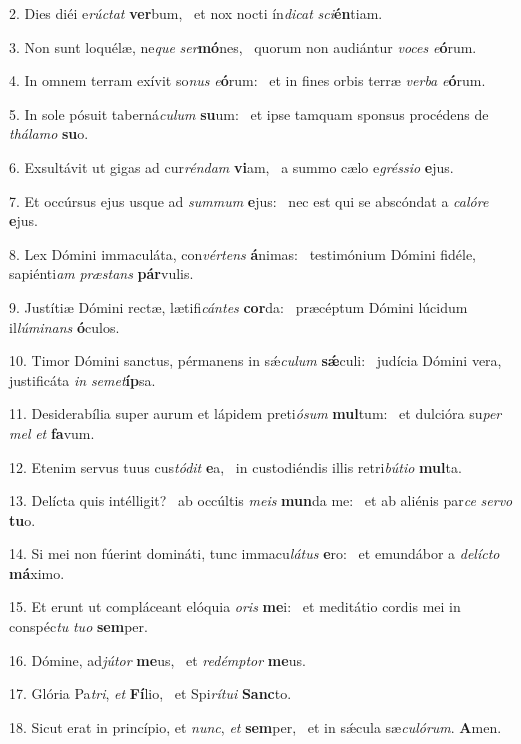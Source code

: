 2. Dies diéi e\textit{rúc}\textit{tat} \textbf{ver}bum, \ast\  et nox nocti ín\textit{di}\textit{cat} \textit{sci}\textbf{én}tiam.\

3. Non sunt loquélæ, ne\textit{que} \textit{ser}\textbf{mó}nes, \ast\  quorum non audiántur \textit{vo}\textit{ces} \textit{e}\textbf{ó}rum.\

4. In omnem terram exívit so\textit{nus} \textit{e}\textbf{ó}rum: \ast\  et in fines orbis terræ \textit{ver}\textit{ba} \textit{e}\textbf{ó}rum.\

5. In sole pósuit taberná\textit{cu}\textit{lum} \textbf{su}um: \ast\  et ipse tamquam sponsus procédens de \textit{thá}\textit{la}\textit{mo} \textbf{su}o.\

6. Exsultávit ut gigas ad cur\textit{rén}\textit{dam} \textbf{vi}am, \ast\  a summo cælo e\textit{grés}\textit{si}\textit{o} \textbf{e}jus.\

7. Et occúrsus ejus usque ad \textit{sum}\textit{mum} \textbf{e}jus: \ast\  nec est qui se abscóndat a \textit{ca}\textit{ló}\textit{re} \textbf{e}jus.\

8. Lex Dómini immaculáta, con\textit{vér}\textit{tens} \textbf{á}nimas: \ast\  testimónium Dómini fidéle, sapiénti\textit{am} \textit{præ}\textit{stans} \textbf{pár}vulis.\

9. Justítiæ Dómini rectæ, lætifi\textit{cán}\textit{tes} \textbf{cor}da: \ast\  præcéptum Dómini lúcidum il\textit{lú}\textit{mi}\textit{nans} \textbf{ó}culos.\

10. Timor Dómini sanctus, pérmanens in sǽ\textit{cu}\textit{lum} \textbf{sǽ}culi: \ast\  judícia Dómini vera, justificáta \textit{in} \textit{se}\textit{met}\textbf{íp}sa.\

11. Desiderabília super aurum et lápidem preti\textit{ó}\textit{sum} \textbf{mul}tum: \ast\  et dulcióra su\textit{per} \textit{mel} \textit{et} \textbf{fa}vum.\

12. Etenim servus tuus cus\textit{tó}\textit{dit} \textbf{e}a, \ast\  in custodiéndis illis retri\textit{bú}\textit{ti}\textit{o} \textbf{mul}ta.\

13. Delícta quis intélligit? \dag\  ab occúltis \textit{me}\textit{is} \textbf{mun}da me: \ast\  et ab aliénis par\textit{ce} \textit{ser}\textit{vo} \textbf{tu}o.\

14. Si mei non fúerint domináti, tunc immacu\textit{lá}\textit{tus} \textbf{e}ro: \ast\  et emundábor a \textit{de}\textit{líc}\textit{to} \textbf{má}ximo.\

15. Et erunt ut compláceant elóquia \textit{o}\textit{ris} \textbf{me}i: \ast\  et meditátio cordis mei in conspéc\textit{tu} \textit{tu}\textit{o} \textbf{sem}per.\

16. Dómine, ad\textit{jú}\textit{tor} \textbf{me}us, \ast\  et \textit{red}\textit{émp}\textit{tor} \textbf{me}us.\

17. Glória Pa\textit{tri}, \textit{et} \textbf{Fí}lio, \ast\  et Spi\textit{rí}\textit{tu}\textit{i} \textbf{Sanc}to.\

18. Sicut erat in princípio, et \textit{nunc}, \textit{et} \textbf{sem}per, \ast\  et in sǽcula sæ\textit{cu}\textit{ló}\textit{rum}. \textbf{A}men.\

